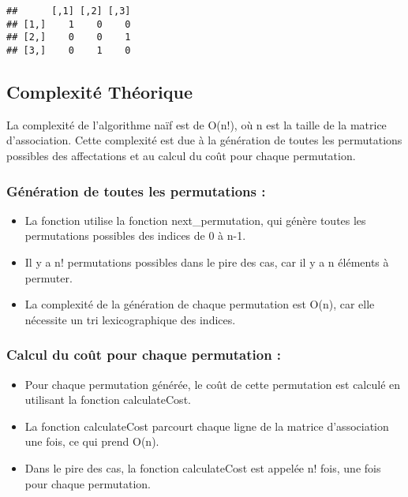 \documentclass[
]{article}
\providecommand{\tightlist}{%
  \setlength{\itemsep}{0pt}\setlength{\parskip}{0pt}}
\begin{document}
\begin{verbatim}
##      [,1] [,2] [,3]
## [1,]    1    0    0
## [2,]    0    0    1
## [3,]    0    1    0
\end{verbatim}

\hypertarget{complexituxe9-thuxe9orique}{%
\subsection{Complexité Théorique}\label{complexituxe9-thuxe9orique}}

La complexité de l'algorithme naïf est de O(n!), où n est la taille de
la matrice d'association. Cette complexité est due à la génération de
toutes les permutations possibles des affectations et au calcul du coût
pour chaque permutation.

\hypertarget{guxe9nuxe9ration-de-toutes-les-permutations}{%
\subsubsection{Génération de toutes les permutations
:}\label{guxe9nuxe9ration-de-toutes-les-permutations}}

\begin{itemize}
\tightlist
\item
  La fonction utilise la fonction next\_permutation, qui génère toutes
  les permutations possibles des indices de 0 à n-1.
\item
  Il y a n! permutations possibles dans le pire des cas, car il y a n
  éléments à permuter.
\item
  La complexité de la génération de chaque permutation est O(n), car
  elle nécessite un tri lexicographique des indices.
\end{itemize}

\hypertarget{calcul-du-couxfbt-pour-chaque-permutation}{%
\subsubsection{Calcul du coût pour chaque permutation
:}\label{calcul-du-couxfbt-pour-chaque-permutation}}

\begin{itemize}
\tightlist
\item
  Pour chaque permutation générée, le coût de cette permutation est
  calculé en utilisant la fonction calculateCost.
\item
  La fonction calculateCost parcourt chaque ligne de la matrice
  d'association une fois, ce qui prend O(n).
\item
  Dans le pire des cas, la fonction calculateCost est appelée n! fois,
  une fois pour chaque permutation.
\end{itemize}
\end{document}
